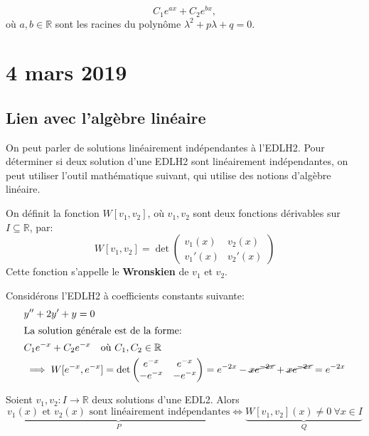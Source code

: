 \documentclass{report}
\begin{document}
\begin{thm}
	\begin{equation}
		C_1 e^{ax} + C_2 e^{bx},
	\end{equation}
où $a, b \in \mathbb R$ sont les racines du polynôme $\lambda^2 + p\lambda + q = 0$.
\end{thm}

\section{4 mars 2019}

\subsection{Lien avec l'algèbre linéaire}
On peut parler de solutions linéairement indépendantes à l'EDLH2. Pour déterminer si deux solution d'une EDLH2 sont linéairement indépendantes, on peut utiliser l'outil mathématique suivant, qui utilise des notions d'algèbre linéaire.
\begin{defn}
On définit la fonction $W[v_1, v_2]$, où $v_1, v_2$ sont deux fonctions dérivables sur $I \subseteq \mathbb R$, par:
	\begin{equation}
		W[v_1, v_2] = \det \begin{pmatrix}
			v_1(x) & v_2(x) \\
			v_1'(x) & v_2'(x)
		\end{pmatrix}
	\end{equation}
	Cette fonction s'appelle le \textbf{Wronskien} de $v_1$ et $v_2$.
\end{defn}

\begin{exmp}
Considérons l'EDLH2 à coefficients constants suivante:
	\begin{align*}
		&y'' + 2y' + y = 0 \\
	\intertext{La solution générale est de la forme:}
		&C_1 e^{-x} + C_2 e^{-x} \quad \text{où } C_1, C_2 \in \mathbb R \\
		&\implies W[e^{-x}, e^{-x}] = \det \begin{pmatrix}
			e^{-x} & e^{-x} \\
			-e^{-x} & -e^{-x}
			\end{pmatrix} = e^{-2x} - \cancel{xe^{-2x}} + \cancel{xe^{-2x}} = e^{-2x}
	\end{align*}
\end{exmp}

\begin{thm}
	Soient $v_1, v_2 : I \to \mathbb R$ deux solutions d'une EDL2. Alors
	\begin{equation}
		\underbrace{v_1(x) \text{ et } v_2(x) \text{ sont linéairement indépendantes}}_{P} \iff \underbrace{W[v_1, v_2](x) \neq 0 \ \forall x \in I}_{Q}
	\end{equation}
\end{thm}
\end{document}
